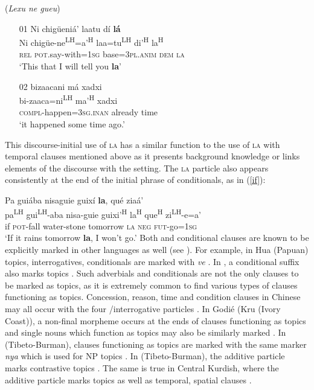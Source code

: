 \ea\label{initial2} (\textit{Lexu ne gueu})
\begin{itemize}
\item[01]
\glll Ni chig\"{u}eni\'{a}' laatu d\'{i} \textbf{l\'{a}}  \\
Ni chig\"{u}e-ne\textsuperscript{LH}=a'\textsuperscript{H} laa=tu\textsuperscript{LH} di'\textsuperscript{H}  la\textsuperscript{H}  \\
\textsc{rel} \textsc{pot}.say-with=1\textsc{sg} base=3\textsc{pl.anim} \textsc{dem} \textsc{la}  \\
\glt  `This that I will tell you \textbf{la}'


\item[02]
\glll bizaacani m\'{a} xadxi  \\
bi-zaaca=ni\textsuperscript{LH} ma'\textsuperscript{H} xadxi  \\
\textsc{compl}-happen=3\textsc{sg.inan} already time  \\
\glt  `it happened some time ago.'

\end{itemize}
\z
This discourse-initial use of \textsc{la} has a similar function to the use of \textsc{la} with temporal clauses mentioned above as it presents background knowledge or links elements of the discourse with the setting. The \textsc{la} particle also appears consistently at the end of the initial phrase of conditionals, as in (\ref{if}):

\ea\label{if}
\glll Pa gui\'{a}ba nisaguie guix\'{i} \textbf{la}, qu\'{e} zia\'{a}'  \\
pa\textsuperscript{LH} gui\textsuperscript{LH}-aba nisa-guie guixi'\textsuperscript{H}  la\textsuperscript{H} que\textsuperscript{H} zi\textsuperscript{LH}-e=a'  \\
if \textsc{pot}-fall water-stone tomorrow \textsc{la} \textsc{neg} \textsc{fut}-go=1\textsc{sg}  \\
\glt `If it rains tomorrow \textbf{la}, I won't go.' \hfill \citep[109]{pickett1998}
\z
Both  and conditional clauses are known to be explicitly marked in other languages as well (see \citet[292]{thompson2007}). For example, in Hua (Papuan) topics, interrogatives, conditionals are marked with \textit{ve} \citep{haiman1978}. In , a conditional suffix also marks topics \citep{kerslake1996}. Such adverbials and conditionals are not the only clauses to be marked as topics, as it is extremely common to find various types of  clauses functioning as topics. Concession, reason, time and condition clauses in Chinese may all occur with the four /interrogative particles \citep[293]{thompson2007}. In Godi\'{e} (Kru (Ivory Coast)), a non-final morpheme occurs at the ends of  clauses functioning as topics and single nouns which function as topics may also be similarly marked \citep{marchese1977,marchese1987}. In  (Tibeto-Burman),  clauses functioning as topics are marked with the same marker \textit{nya} which is used for NP topics \citep[294]{thompson2007}. In  (Tibeto-Burman), the additive particle marks contrastive topics \citep{konnerth2013}. The same is true in Central Kurdish, where the additive particle marks topics as well as temporal, spatial clauses \citep{opengin2013}.

